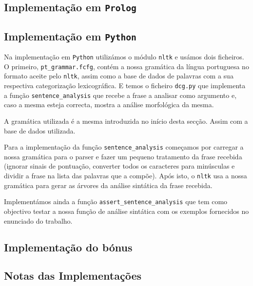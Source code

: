 \documentclass[12pt,a4paper,oneside]{article}
\begin{document}
\lipsum[3]


\subsection{Implementação em \texttt{Prolog}}

\lipsum[1]

\lipsum[2]

\lipsum[3]

\subsection{Implementação em \texttt{Python}}

Na implementação em \texttt{Python} utilizámos o módulo \texttt{nltk} e
usámos dois ficheiros. O primeiro, \texttt{pt\_grammar.fcfg}, contém a nossa
gramática da língua portuguesa no formato aceite pelo \texttt{nltk}, assim como
a base de dados de palavras com a sua respectiva categorização lexicográfica.
E temos o ficheiro \texttt{dcg.py} que implementa a função \texttt{sentence\_analysis}
que recebe a frase a analisar como argumento e, caso a mesma esteja correcta, mostra
a análise morfológica da mesma.

A gramática utilizada é a mesma introduzida no início desta secção. Assim com a base
de dados utilizada.

Para a implementação da função \texttt{sentence\_analysis} começamos por carregar a
nossa gramática para o parser e fazer um pequeno tratamento da frase recebida (ignorar
sinais de pontuação, converter todos os caracteres para minúsculas e dividir a frase
na lista das palavras que a compõe). Após isto, o \texttt{nltk} usa a nossa gramática
para gerar as árvores da análise sintática da frase recebida.

Implementámos ainda a função \texttt{assert\_sentence\_analysis} que tem como objectivo
testar a nossa função de análise sintática com os exemplos fornecidos no enunciado do
trabalho.

\subsection{Implementação do bónus}

\lipsum[1]

\lipsum[2]

\lipsum[3]

\subsection{Notas das Implementações}
\end{document}
